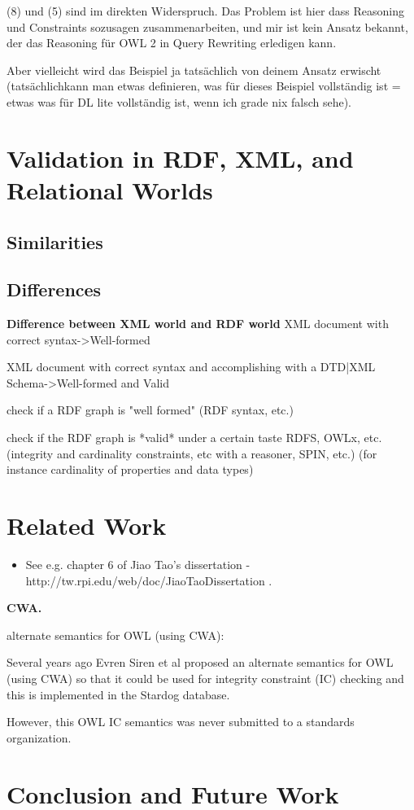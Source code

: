 \documentclass{llncs}
\begin{document}
(8) und (5) sind im direkten Widerspruch. Das Problem ist hier dass
Reasoning und Constraints sozusagen zusammenarbeiten, und mir ist kein
Ansatz bekannt, der das Reasoning für OWL 2 in Query Rewriting erledigen
kann.

Aber vielleicht wird das Beispiel ja tatsächlich von deinem Ansatz
erwischt (tatsächlichkann man etwas definieren, was für dieses Beispiel
vollständig ist = etwas was für DL lite vollständig ist, wenn ich grade
nix falsch sehe).

\section{Validation in RDF, XML, and Relational Worlds}

\subsection{Similarities}



\subsection{Differences}

\textbf{Difference between XML world and RDF world}
XML document with correct syntax->Well-formed

XML document with correct syntax and accomplishing with a DTD|XML Schema->Well-formed and Valid

check if a RDF graph is "well formed" (RDF syntax, etc.)

check if the RDF graph is *valid* under a certain taste RDFS, OWLx, etc. (integrity and cardinality constraints, etc with a reasoner, SPIN, etc.) (for instance cardinality of properties and data types)

\section{Related Work}

\begin{itemize}
	\item See e.g. chapter 6 of Jiao Tao's dissertation - http://tw.rpi.edu/web/doc/JiaoTaoDissertation .
\end{itemize}

\textbf{CWA.}

alternate semantics for OWL (using CWA):

Several years ago Evren Siren et al proposed an alternate semantics for OWL (using CWA) so that it could be used for integrity constraint (IC) checking and this is implemented in the Stardog database. 

However, this OWL IC semantics was never submitted to a standards organization.

\section{Conclusion and Future Work}



{}

\setcounter{tocdepth}{1}
\end{document}
